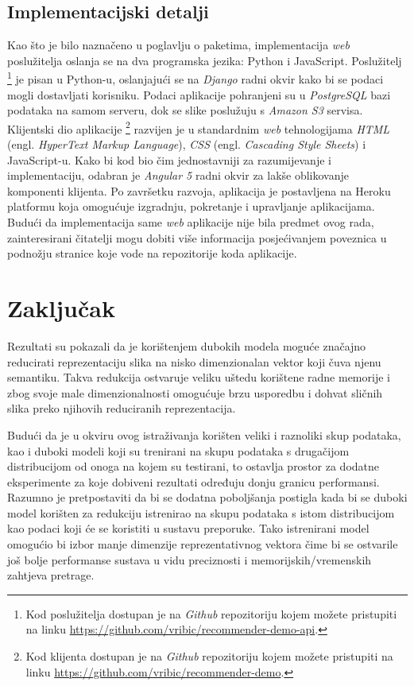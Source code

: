 \documentclass[times, utf8, proizvoljni, numeric]{fer}
\begin{document}
\section{Implementacijski detalji}

Kao što je bilo naznačeno u poglavlju o paketima, implementacija \textit{web} poslužitelja oslanja se na dva programska jezika: Python i JavaScript. Poslužitelj \footnote{Kod poslužitelja dostupan je na \textit{Github} repozitoriju kojem možete pristupiti na linku \url{https://github.com/vribic/recommender-demo-api}.} je pisan u Python-u, oslanjajući se na \textit{Django} radni okvir kako bi se podaci mogli dostavljati korisniku. Podaci aplikacije pohranjeni su u \textit{PostgreSQL} bazi podataka na samom serveru, dok se slike poslužuju s \textit{Amazon S3} servisa. Klijentski dio aplikacije \footnote{Kod klijenta dostupan je na \textit{Github} repozitoriju kojem možete pristupiti na linku \url{https://github.com/vribic/recommender-demo}.} razvijen je u standardnim \textit{web} tehnologijama \textit{HTML} (engl. \textit{HyperText Markup Language}), \textit{CSS} (engl. \textit{Cascading Style Sheets}) i JavaScript-u. Kako bi kod bio čim jednostavniji za razumijevanje i implementaciju, odabran je \textit{Angular 5} radni okvir za lakše oblikovanje komponenti klijenta. Po završetku razvoja, aplikacija je postavljena na Heroku platformu koja omogućuje izgradnju, pokretanje i upravljanje aplikacijama. Budući da implementacija same \textit{web} aplikacije nije bila predmet ovog rada, zainteresirani čitatelji mogu dobiti više informacija posjećivanjem poveznica u podnožju stranice koje vode na repozitorije koda aplikacije.



\chapter{Zaključak}

Rezultati su pokazali da je korištenjem dubokih modela moguće značajno reducirati reprezentaciju slika na nisko dimenzionalan vektor koji čuva njenu semantiku. Takva redukcija ostvaruje veliku uštedu korištene radne memorije i zbog svoje male dimenzionalnosti omogućuje brzu usporedbu i dohvat sličnih slika preko njihovih reduciranih reprezentacija. 

Budući da je u okviru ovog istraživanja korišten veliki i raznoliki skup podataka, kao i duboki modeli koji su trenirani na skupu podataka s drugačijom distribucijom od onoga na kojem su testirani, to ostavlja prostor za dodatne eksperimente za koje dobiveni rezultati određuju donju granicu performansi. Razumno je pretpostaviti da bi se dodatna poboljšanja postigla kada bi se duboki model korišten za redukciju istrenirao na skupu podataka s istom distribucijom kao podaci koji će se koristiti u sustavu preporuke. Tako istrenirani model omogućio bi izbor manje dimenzije reprezentativnog vektora čime bi se ostvarile još bolje performanse sustava u vidu preciznosti i memorijskih/vremenskih zahtjeva pretrage.
\end{document}
